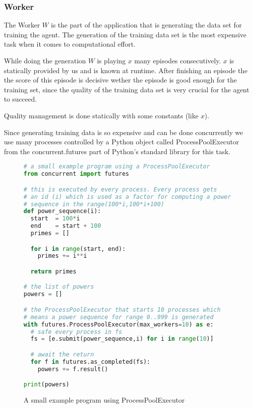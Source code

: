 \subsubsection{Worker}

The Worker $W$ is the part of the application that is
generating the data set for training the agent. The
generation of the training data set is the most expensive
task when it comes to computational effort.

While doing the generation $W$ is playing $x$ many episodes
consecutively. $x$ is statically provided by us and is
known at runtime. After finishing an episode the the score
of this episode is decisive wether the episode is good
enough for the training set, since the quality of the
training data set is very crucial for the agent to succeed.

Quality management is done statically with some constants
(like $x$).

Since generating training data is so expensive and can be
done concurrently we use many processes controlled by a
Python object called ProcessPoolExecutor from the
concurrent.futures part of Python's standard library for
this task.

\begin{figure}[H]
\begin{mdframed}[style=codebox]
\begin{lstlisting}[language=Python]
# a small example program using a ProcessPoolExecutor
from concurrent import futures

# this is executed by every process. Every process gets
# an id (i) which is used as a factor for computing a power
# sequence in the range(100*i,100*i+100)
def power_sequence(i):
  start  = 100*i
  end    = start + 100
  primes = []

  for i in range(start, end):
    primes += i**i

  return primes

# the list of powers
powers = []

# the ProcessPoolExecutor that starts 10 processes which
# means a power sequence for range 0..999 is generated
with futures.ProcessPoolExecutor(max_workers=10) as e:
  # safe every process in fs
  fs = [e.submit(power_sequence,i) for i in range(10)]

  # await the return
  for f in futures.as_completed(fs):
    powers += f.result()

print(powers)
\end{lstlisting}
\end{mdframed}
\caption{A small example program using ProcessPoolExecutor}
\end{figure}

